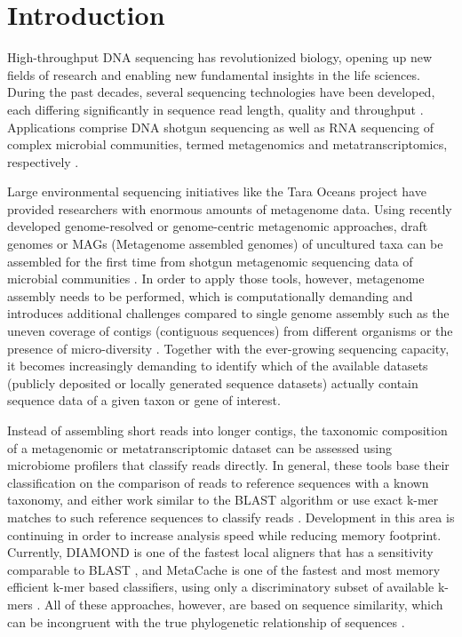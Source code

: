 \documentclass{bioinfo}
\begin{document}
\maketitle

\section{Introduction}
High-throughput DNA sequencing has revolutionized biology, opening up new fields of research and enabling new fundamental insights in the life sciences. During the past decades, several sequencing technologies have been developed, each differing significantly in sequence read length, quality and throughput \citep{Mardis2017}. Applications comprise DNA shotgun sequencing as well as RNA sequencing of complex microbial communities, termed metagenomics and metatranscriptomics, respectively \citep{Mitchell2018}. 

Large environmental sequencing initiatives like the Tara Oceans project \citep{Sunagawa2015} have provided researchers with enormous amounts of metagenome data. Using recently developed genome-resolved or genome-centric metagenomic approaches, draft genomes or MAGs (Metagenome assembled genomes) of uncultured taxa can be assembled for the first time from shotgun metagenomic sequencing data of microbial communities \citep{Alneberg2014,Eren2015}. In order to apply those tools, however, metagenome assembly needs to be performed, which is computationally demanding and introduces additional challenges compared to single genome assembly such as the uneven coverage of contigs (contiguous sequences) from different organisms or the presence of micro-diversity \citep{Quince2017}. Together with the ever-growing sequencing capacity, it becomes increasingly demanding to identify which of the available datasets (publicly deposited or locally generated sequence datasets) actually contain sequence data of a given taxon or gene of interest.

Instead of assembling short reads into longer contigs, the taxonomic composition of a metagenomic or metatranscriptomic dataset can be assessed using microbiome profilers that classify reads directly. In general, these tools base their classification on the comparison of reads to reference sequences with a known taxonomy, and either work similar to the BLAST algorithm \citep[e.g. ][]{Huson2016,Truong2015} or use exact k-mer matches to such reference sequences to classify reads \citep[e.g. ][]{Ounit2015,Wood2014}. Development in this area is continuing in order to increase analysis speed while reducing memory footprint. Currently, DIAMOND is one of the fastest local aligners that has a sensitivity comparable to BLAST \citep{Buchfink2014}, and MetaCache is one of the fastest and most memory efficient k-mer based classifiers, using only a discriminatory subset of available k-mers \citep{Muller2017}. All of these approaches, however, are based on sequence similarity, which can be incongruent with the true phylogenetic relationship of sequences \citep{Smith2017}.
\end{document}
